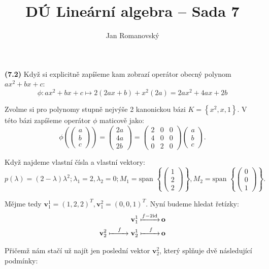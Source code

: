 \documentclass{article}
\title{DÚ Lineární algebra -- Sada 7}
\author{Jan Romanovský}
\begin{document}
\maketitle

\textbf{(7.2)} Když si explicitně zapíšeme kam zobrazí operátor obecný polynom $ax^2 + bx + c$:
$$\phi:ax^2+ bx + c \longmapsto 2(2ax+b)+x^2(2a)=2ax^2+4ax+2b$$

Zvolme si pro polynomy stupně nejvýše 2 kanonickou bázi $K = \left\{x^2, x, 1\right\}$. V této bázi zapíšeme operátor $\phi$ maticově jako:
$$\phi\left(\begin{pmatrix}
   a \\ b \\ c
\end{pmatrix}\right) = \begin{pmatrix}
   2a \\ 4a \\ 2b
\end{pmatrix}= \begin{pmatrix}
    2 & 0 & 0\\
    4 & 0 & 0\\
    0 & 2 & 0
\end{pmatrix}\begin{pmatrix}
   a \\ b \\ c
\end{pmatrix}.$$

Když najdeme vlastní čísla a vlastní vektory:
$$p(\lambda)=(2-\lambda)\lambda^2; \lambda_1 = 2, \lambda_2 = 0; M_1 = \text{span }\left\{\begin{pmatrix}
   1 \\ 2 \\ 2
\end{pmatrix}\right\}, M_2 = \text{span }\left\{\begin{pmatrix}
   0 \\ 0 \\ 1
\end{pmatrix}\right\}.$$

Mějme tedy $\textbf{v}_1^1 = (1, 2, 2)^T, \textbf{v}_1^2 = (0, 0, 1)^T$. Nyní budeme hledat řetízky:
\begin{align*}
    \textbf{v}_1^1 \xmapsto{f-2\text{id}} &\,\textbf{o}\\
    \textbf{v}_2^2 \xmapsto{\phantom{-2}f\phantom{\text{id}}} \textbf{v}_2^1 \xmapsto{\phantom{-2}f\phantom{\text{id}}} &\,\textbf{o}
\end{align*}

Přičemž nám stačí už najít jen poslední vektor $\textbf{v}_2^2$, který splňuje dvě následující podmínky:
\end{document}
